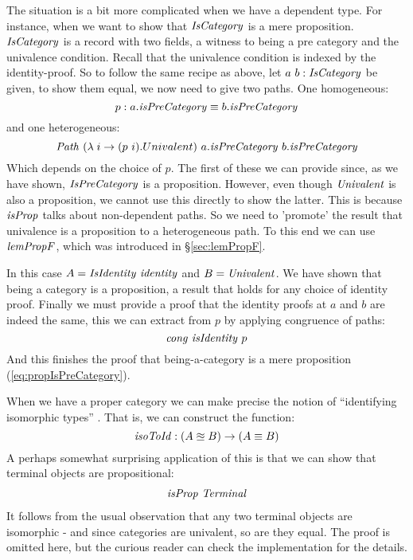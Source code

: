 The situation is a bit more complicated when we have a dependent type. For
instance, when we want to show that $\IsCategory$ is a mere proposition.
$\IsCategory$ is a record with two fields, a witness to being a pre category and
the univalence condition. Recall that the univalence condition is indexed by the
identity-proof. So to follow the same recipe as above, let $a\ b \tp
\IsCategory$ be given, to show them equal, we now need to give two paths. One homogeneous:
%
$$
p \tp a.\isPreCategory \equiv b.\isPreCategory
$$
%
and one heterogeneous:
%
$$
\Path\ (\lambda\; i \to (p\ i).Univalent)\ a.\isPreCategory\ b.\isPreCategory
$$
%
Which depends on the choice of $p$. The first of these we can provide since, as
we have shown, $\IsPreCategory$ is a proposition. However, even though
$\Univalent$ is also a proposition, we cannot use this directly to show the
latter. This is because $\isProp$ talks about non-dependent paths. So we need to
'promote' the result that univalence is a proposition to a heterogeneous path.
To this end we can use $\lemPropF$, which was introduced in \S\ref{sec:lemPropF}.

In this case $A = \var{IsIdentity}\ \identity$ and $B = \Univalent$. We have
shown that being a category is a proposition, a result that holds for any choice
of identity proof. Finally we must provide a proof that the identity proofs at
$a$ and $b$ are indeed the same, this we can extract from $p$ by applying
congruence of paths:
%
$$
\congruence\ \isIdentity\ p
$$
%
And this finishes the proof that being-a-category is a mere proposition
(\ref{eq:propIsPreCategory}).

When we have a proper category we can make precise the notion of ``identifying
isomorphic types'' . That is, we can construct the
function:
%
$$
\isoToId \tp (A \approxeq B) \to (A \equiv B)
$$
%
A perhaps somewhat surprising application of this is that we can show that
terminal objects are propositional:
%
\begin{align}
\label{eq:termProp}
\isProp\ \var{Terminal}
\end{align}
%
It follows from the usual observation that any two terminal objects are
isomorphic - and since categories are univalent, so are they equal. The proof is
omitted here, but the curious reader can check the implementation for the
details. 

